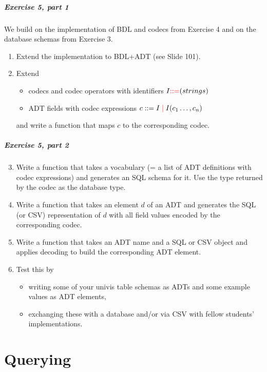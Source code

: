 \begin{frame}\frametitle{Exercise 5, part 1}
We build on the implementation of BDL and codecs from Exercise 4 and on the database schemas from Exercise 3.

\begin{enumerate}
 \item Extend the implementation to BDL+ADT (see Slide 101).
 \item Extend 
  \begin{itemize}
  \item codecs and codec operators with identifiers $I{\color{red}::=} (strings)$
  \item ADT fields with codec expressions $c::=I \;{\color{red}|}\; I(c_1\ldots,c_n)$
  \end{itemize}
  and write a function that maps $c$ to the corresponding codec.
\end{enumerate}
\end{frame}

\begin{frame}\frametitle{Exercise 5, part 2}

\begin{enumerate}
\setcounter{enumi}{2}
 \item Write a function that takes a vocabulary (= a list of ADT definitions with codec expressions) and generates an SQL schema for it.
 Use the type returned by the codec as the database type.
 \item Write a function that takes an element $d$ of an ADT and generates the SQL (or CSV) representation of $d$ with all field values encoded by the corresponding codec.
 \item Write a function that takes an ADT name and a SQL or CSV object and applies decoding to build the corresponding ADT element.
 \item Test this by
 \begin{itemize}
 \item writing some of your univis table schemas as ADTs and some example values as ADT elements,
 \item exchanging these with a database and/or via CSV with fellow students' implementations.
 \end{itemize}
\end{enumerate}
\end{frame}

\part{Querying}


